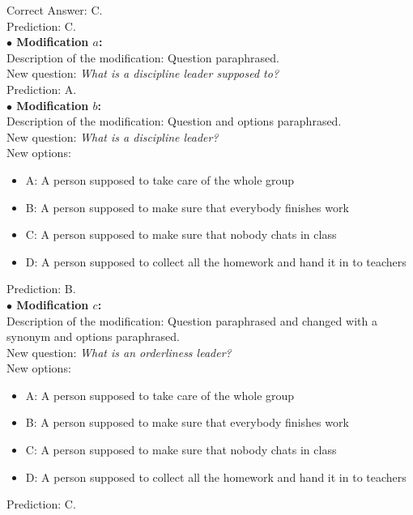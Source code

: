 Correct Answer: C. \\ 
Prediction: C. \\
\textbf{$\bullet$ Modification $a$:} \\
Description of the modification: Question paraphrased.\\
New question: \emph{What is a discipline leader supposed to?} \\
Prediction: A. \\
\textbf{$\bullet$ Modification $b$:} \\
Description of the modification: Question and options paraphrased.\\
New question: \emph{What is a discipline leader?} \\
New options:
\begin{itemize}
 \item A: A person supposed to take care of the whole group
 \item B: A person supposed to make sure that everybody finishes work
 \item C: A person supposed to make sure that nobody chats in class
 \item D: A person supposed to collect all the homework and hand it in to teachers
\end{itemize}
Prediction: B. \\
\textbf{$\bullet$ Modification $c$:} \\
Description of the modification: Question paraphrased and changed with a synonym and options paraphrased.\\
New question: \emph{What is an orderliness leader?} \\
New options:
\begin{itemize}
 \item A: A person supposed to take care of the whole group
 \item B: A person supposed to make sure that everybody finishes work
 \item C: A person supposed to make sure that nobody chats in class
 \item D: A person supposed to collect all the homework and hand it in to teachers
\end{itemize}
Prediction: C.
